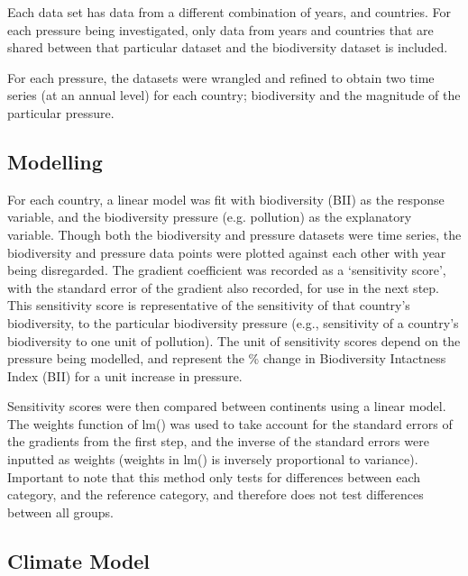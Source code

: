 \documentclass[11pt, a4paper, titlepage]{article}
\begin{document}
	Each data set has data from a different combination of years, and countries. For each pressure being investigated, only data from years and countries that are shared between that particular dataset and the biodiversity dataset is included. 
	
	For each pressure, the datasets were wrangled and refined to obtain two time series (at an annual level) for each country; biodiversity and the magnitude of the particular pressure.
	
	
	\subsection*{Modelling}
	
	For each country, a linear model was fit with biodiversity (BII) as the response variable, and the biodiversity pressure (e.g. pollution) as the explanatory variable. Though both the biodiversity and pressure datasets were time series, the biodiversity and pressure data points were plotted against each other with year being disregarded. The gradient coefficient was recorded as a `sensitivity score', with the standard error of the gradient also recorded, for use in the next step. This sensitivity score is representative of the sensitivity of that country's biodiversity, to the particular biodiversity pressure (e.g., sensitivity of a country's biodiversity to one unit of pollution). The unit of sensitivity scores depend on the pressure being modelled, and represent the \% change in Biodiversity Intactness Index (BII) for a unit increase in pressure. 
	

	Sensitivity scores were then compared between continents using a linear model. The weights function of lm() was used to take account for the standard errors of the gradients from the first step, and the inverse of the standard errors were inputted as weights (weights in lm() is inversely proportional to variance). Important to note that this method only tests for differences between each category, and the reference category, and therefore does not test differences between all groups.  
	
	\subsection*{Climate Model}
	
\end{document}
